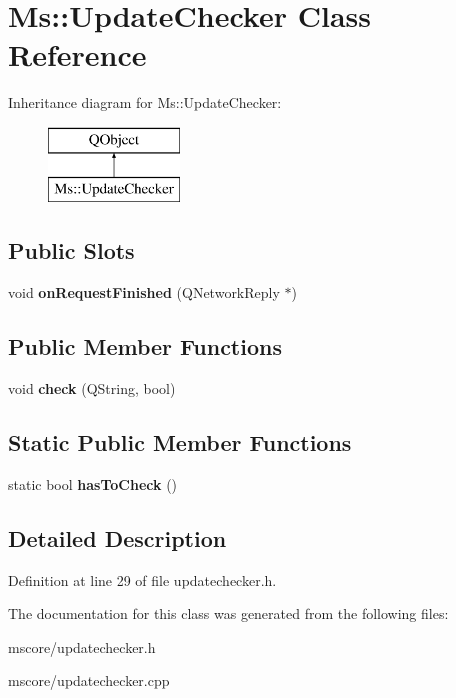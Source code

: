 \hypertarget{class_ms_1_1_update_checker}{}\section{Ms\+:\+:Update\+Checker Class Reference}
\label{class_ms_1_1_update_checker}
Inheritance diagram for Ms\+:\+:Update\+Checker\+:\begin{figure}[H]
\begin{center}
\leavevmode
\includegraphics[height=2.000000cm]{class_ms_1_1_update_checker}
\end{center}
\end{figure}
\subsection*{Public Slots}
\begin{DoxyCompactItemize}
\item 
\mbox{\label{class_ms_1_1_update_checker_ae98de8c20c6ac1130eb8cf003a2edb8f}} 
void {\bfseries on\+Request\+Finished} (Q\+Network\+Reply $\ast$)
\end{DoxyCompactItemize}
\subsection*{Public Member Functions}
\begin{DoxyCompactItemize}
\item 
\mbox{\label{class_ms_1_1_update_checker_a522b025f923897505d1d537857eb5766}} 
void {\bfseries check} (Q\+String, bool)
\end{DoxyCompactItemize}
\subsection*{Static Public Member Functions}
\begin{DoxyCompactItemize}
\item 
\mbox{\label{class_ms_1_1_update_checker_a52781e2d2e594e49f034ae0de4beb02e}} 
static bool {\bfseries has\+To\+Check} ()
\end{DoxyCompactItemize}


\subsection{Detailed Description}


Definition at line 29 of file updatechecker.\+h.



The documentation for this class was generated from the following files\+:\begin{DoxyCompactItemize}
\item 
mscore/updatechecker.\+h\item 
mscore/updatechecker.\+cpp\end{DoxyCompactItemize}
